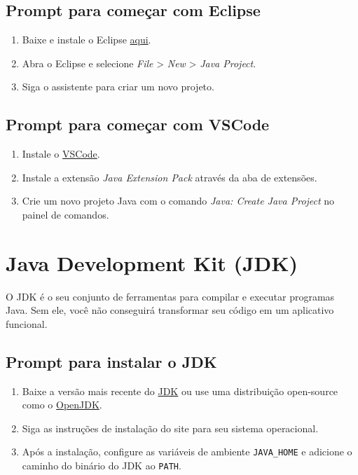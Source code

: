 \documentclass[a4paper,12pt]{book}
\begin{document}
\subsection{Prompt para começar com Eclipse}
\begin{enumerate}
    \item Baixe e instale o Eclipse \href{https://www.eclipse.org/downloads/}{aqui}.
    \item Abra o Eclipse e selecione \textit{File} > \textit{New} > \textit{Java Project}.
    \item Siga o assistente para criar um novo projeto.
\end{enumerate}

\subsection{Prompt para começar com VSCode}
\begin{enumerate}
    \item Instale o \href{https://code.visualstudio.com/}{VSCode}.
    \item Instale a extensão \textit{Java Extension Pack} através da aba de extensões.
    \item Crie um novo projeto Java com o comando \textit{Java: Create Java Project} no painel de comandos.
\end{enumerate}

\section{Java Development Kit (JDK)}

O JDK é o seu conjunto de ferramentas para compilar e executar programas Java. Sem ele, você não conseguirá transformar seu código em um aplicativo funcional.

\subsection{Prompt para instalar o JDK}
\begin{enumerate}
    \item Baixe a versão mais recente do \href{https://www.oracle.com/java/technologies/javase-jdk11-downloads.html}{JDK} ou use uma distribuição open-source como o \href{https://openjdk.java.net/}{OpenJDK}.
    \item Siga as instruções de instalação do site para seu sistema operacional.
    \item Após a instalação, configure as variáveis de ambiente \texttt{JAVA\_HOME} e adicione o caminho do binário do JDK ao \texttt{PATH}.
\end{enumerate}
\end{document}
